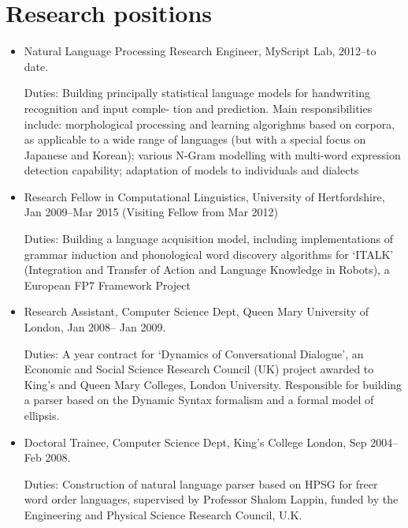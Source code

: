 \documentclass[a4paper]{article}
\begin{document}
\education

\section*{Research positions}

\begin{itemize}

\item \hspace{-2mm}Natural Language Processing Research Engineer, MyScript Lab,  2012--to date.

\hspace{-2mm}Duties: Building principally statistical language models for handwriting recognition and input comple- tion and prediction. Main responsibilities include: morphological processing and learning algorighms based on corpora, as applicable to a wide range of languages (but with a special focus on Japanese and Korean); various N-Gram modelling with multi-word expression detection capability; adaptation of models to individuals and dialects

\item \hspace{-.2cm}Research Fellow in Computational Linguistics,
  University of Hertfordshire, Jan 2009--Mar 2015 (Visiting Fellow from Mar 2012)

\hspace{-.2cm}Duties: Building a language acquisition model, including implementations of  grammar induction and phonological word discovery algorithms for `ITALK' (Integration and Transfer of Action and Language Knowledge in Robots), a European FP7 Framework Project  \\

\item \hspace{-.2cm}Research Assistant, Computer Science Dept, Queen
  Mary University of London, Jan 2008-- Jan 2009.

\hspace{-.2cm}Duties: A year contract for `Dynamics of Conversational
Dialogue', an Economic and Social Science Research Council (UK)
project awarded to King's and Queen Mary Colleges, London University. Responsible for building a parser based on the Dynamic Syntax formalism and a formal model of ellipsis.

\item \hspace{-.2cm}Doctoral Trainee, Computer Science Dept, King's
  College London, Sep 2004-- Feb 2008.

\hspace{-.2cm}Duties: Construction of natural language parser based on
HPSG for freer word order languages, supervised by Professor Shalom
Lappin, funded by the Engineering and Physical Science Research Council, U.K. 
\end{itemize}
\end{document}
